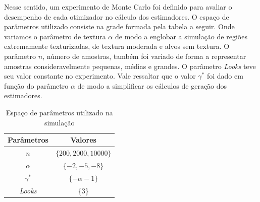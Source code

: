 \documentclass[12pt]{article}
\begin{document}
Nesse sentido, um experimento de Monte Carlo foi definido para avaliar o desempenho de cada otimizador no cálculo dos estimadores. O espaço de parâmetros utilizado consiste na grade formada pela tabela a seguir. Onde variamos o parâmetro de textura $\alpha$ de modo a englobar a simulação de regiões extremamente texturizadas, de textura moderada e alvos sem textura. O parâmetro $n$, número de amostras, também foi variado de forma a representar amostras consideravelmente pequenas, médias e grandes. O parâmetro \textit{Looks} teve seu valor constante no experimento. Vale ressaltar que o valor $\gamma^*$ foi dado em função do parâmetro $\alpha$ de modo a simplificar os cálculos de geração dos estimadores.
\begin{table}[H]
\centering
\caption{Espaço de parâmetros utilizado na simulação}
\smallskip
{}
\label{tab:tabela_parameters}
\begin{tabular}{c|c}
\toprule 
\multicolumn{1}{c|}{Parâmetros} & \multicolumn{1}{c}{Valores}  \\ 
\midrule
\rowcolor[gray]{.9} 
$n$ & $\{200, 2000, 10000\}$ \\ \hline
$\alpha$ & $\{-2, -5, -8\}$ \\ \hline
\rowcolor[gray]{.9} $\gamma^*$ & $\{-\alpha - 1\}$ \\ \hline
\textit{Looks} & \{3\} \\ 
\bottomrule
\end{tabular}
\end{table}
\end{document}
